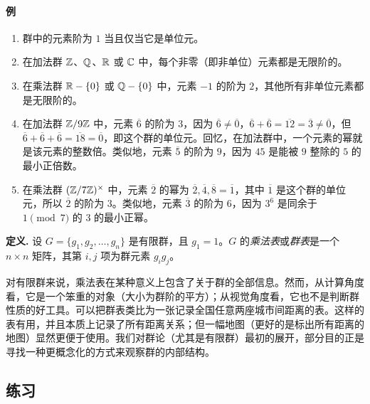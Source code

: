 \paragraph{例}
\begin{enumerate}[label=(\arabic*)]
  \item 群中的元素阶为 $1$ 当且仅当它是单位元。
  \item 在加法群 $\mathbb{Z}$、$\mathbb{Q}$、$\mathbb{R}$ 或 $\mathbb{C}$ 中，每个非零（即非单位）元素都是无限阶的。
  \item 在乘法群 $\mathbb{R}-\{0\}$ 或 $\mathbb{Q}-\{0\}$ 中，元素 $-1$ 的阶为 $2$，其他所有非单位元素都是无限阶的。
  \item 在加法群 $\mathbb{Z}/9\mathbb{Z}$ 中，元素 $\overline{6}$ 的阶为 $3$，因为 $\overline{6}\neq\overline{0}$，$\overline{6}+\overline{6}=\overline{12}=\overline{3}\neq\overline{0}$，但 $\overline{6}+\overline{6}+\overline{6}=\overline{18}=\overline{0}$，即这个群的单位元。回忆，在加法群中，一个元素的幂就是该元素的整数倍。类似地，元素 $\overline{5}$ 的阶为 $9$，因为 $45$ 是能被 $9$ 整除的 $5$ 的最小正倍数。
  \item 在乘法群 $(\mathbb{Z}/7\mathbb{Z})^\times$ 中，元素 $\overline{2}$ 的幂为 $\overline{2},\overline{4},\overline{8}=\overline{1}$，其中 $\overline{1}$ 是这个群的单位元，所以 $\overline{2}$ 的阶为 $3$。类似地，元素 $\overline{3}$ 的阶为 $6$，因为 $3^6$ 是同余于 $1\pmod 7$ 的 $3$ 的最小正幂。
\end{enumerate}

\noindent\textbf{定义.} 设 $G=\{g_1,g_2,\ldots,g_n\}$ 是有限群，且 $g_1=1$。$G$ 的\emph{乘法表}或\emph{群表}是一个 $n\times n$ 矩阵，其第 $i,j$ 项为群元素 $g_ig_j$。

对有限群来说，乘法表在某种意义上包含了关于群的全部信息。然而，从计算角度看，它是一个笨重的对象（大小为群阶的平方）；从视觉角度看，它也不是判断群性质的好工具。可以把群表类比为一张记录全国任意两座城市间距离的表。这样的表有用，并且本质上记录了所有距离关系；但一幅地图（更好的是标出所有距离的地图）显然更便于使用。我们对群论（尤其是有限群）最初的展开，部分目的正是寻找一种更概念化的方式来观察群的内部结构。

\subsection*{练习}

